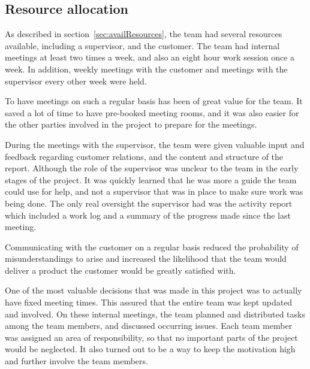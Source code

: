\subsection{Resource allocation}
As described in section~\ref{sec:availResources}, the team had several resources available, including a supervisor, and the customer. The team had internal meetings at least two times a week, and also an eight hour work session once a week. In addition, weekly meetings with the customer and meetings with the supervisor every other week were held.

To have meetings on such a regular basis has been of great value for the team. It saved a lot of time to have pre-booked meeting rooms, and it was also easier for the other parties involved in the project to prepare for the meetings.

During the meetings with the supervisor, the team were given valuable input and feedback regarding customer relations, and the content and structure of the report. Although the role of the supervisor was unclear to the team in the early stages of the project. It was quickly learned that he was more a guide the team could use for help, and not a supervisor that was in place to make sure work was being done. The only real oversight the supervisor had was the activity report which included a work log and a summary of the progress made since the last meeting.

Communicating with the customer on a regular basis reduced the probability of misunderstandings to arise and increased the likelihood that the team would deliver a product the customer would be greatly satisfied with. 

One of the most valuable decisions that was made in this project was to actually have fixed meeting times. This assured that the entire team was kept updated and involved. On these internal meetings, the team planned and distributed tasks among the team members, and discussed occurring issues. Each team member was assigned an area of responsibility, so that no important parts of the project would be neglected. It also turned out to be a way to keep the motivation high and further involve the team members.
